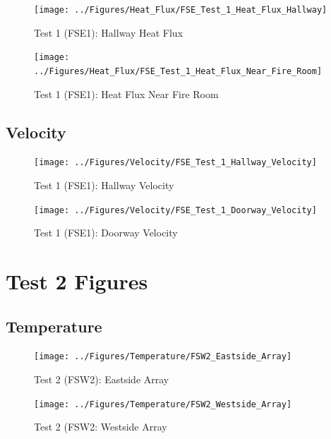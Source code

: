 \documentclass[12pt,oneside]{book}
\begin{document}
\begin{figure}[!ht]
	\texttt{[image: ../Figures/Heat\_Flux/FSE\_Test\_1\_Heat\_Flux\_Hallway]}
	\caption{Test 1 (FSE1): Hallway Heat Flux}
	\label{fig:Test_1_Hallway_Heat_Flux}
\end{figure}

\begin{figure}[!ht]
	\texttt{[image: ../Figures/Heat\_Flux/FSE\_Test\_1\_Heat\_Flux\_Near\_Fire\_Room]}
	\caption{Test 1 (FSE1): Heat Flux Near Fire Room}
	\label{fig:Test_1_Heat_Flux_Near_Fire_Room}
\end{figure}

\subsection{Velocity}
\label{subsec:Velocity}

\begin{figure}[!ht]
	\texttt{[image: ../Figures/Velocity/FSE\_Test\_1\_Hallway\_Velocity]}
	\caption{Test 1 (FSE1): Hallway Velocity}
	\label{fig:Test_1_Hallway_Velocity}
\end{figure}

\begin{figure}[!ht]
	\texttt{[image: ../Figures/Velocity/FSE\_Test\_1\_Doorway\_Velocity]}
	\caption{Test 1 (FSE1): Doorway Velocity}
	\label{fig:Test_1_Doorway_Velocity}
\end{figure}

\clearpage

\section{Test 2 Figures}
\label{subsec:Test_2_Figures}

\subsection{Temperature}
\label{subsec:Temperature}

\begin{figure}[!ht]
	\texttt{[image: ../Figures/Temperature/FSW2\_Eastside\_Array]}
	\caption{Test 2 (FSW2): Eastside Array}
	\label{fig:Test_2_Eastside_Array}
\end{figure}

\begin{figure}[!ht]
	\texttt{[image: ../Figures/Temperature/FSW2\_Westside\_Array]}
	\caption{Test 2 (FSW2: Westside Array}
	\label{fig:Test_2_Westside_Array}
\end{figure}
\end{document}
